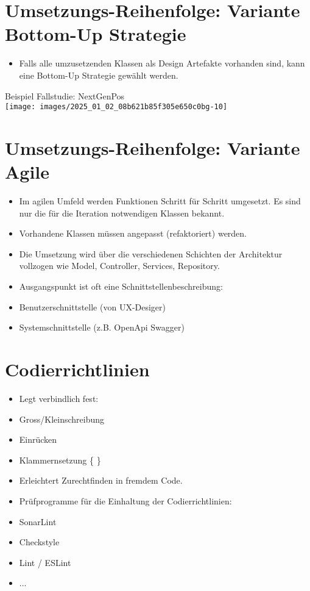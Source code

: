 \documentclass[10pt]{article}
\begin{document}
\section*{Umsetzungs-Reihenfolge: Variante Bottom-Up Strategie}
\begin{itemize}
  \item Falls alle umzusetzenden Klassen als Design Artefakte vorhanden sind, kann eine Bottom-Up Strategie gewählt werden.
\end{itemize}

Beispiel Fallstudie: NextGenPos\\
\texttt{[image: images/2025\_01\_02\_08b621b85f305e650c0bg-10]}

\section*{Umsetzungs-Reihenfolge: Variante Agile}
\begin{itemize}
  \item Im agilen Umfeld werden Funktionen Schritt für Schritt umgesetzt. Es sind nur die für die Iteration notwendigen Klassen bekannt.
  \item Vorhandene Klassen müssen angepasst (refaktoriert) werden.
  \item Die Umsetzung wird über die verschiedenen Schichten der Architektur vollzogen wie Model, Controller, Services, Repository.
  \item Ausgangspunkt ist oft eine Schnittstellenbeschreibung:
  \item Benutzerschnittstelle (von UX-Desiger)
  \item Systemschnittstelle (z.B. OpenApi Swagger)
\end{itemize}

\section*{Codierrichtlinien}
\begin{itemize}
  \item Legt verbindlich fest:
  \item Gross/Kleinschreibung
  \item Einrücken
  \item Klammernsetzung \{ \}
  \item Erleichtert Zurechtfinden in fremdem Code.
  \item Prüfprogramme für die Einhaltung der Codierrichtlinien:
  \item SonarLint
  \item Checkstyle
  \item Lint / ESLint
  \item ...
\end{itemize}
\end{document}
